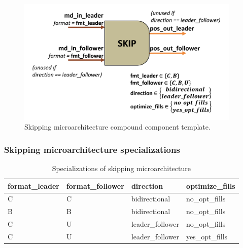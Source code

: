 \begin{figure}[H]
    \centering
    \includegraphics[width=0.95\textwidth]{figures/SKIP.png}
    \caption{Skipping microarchitecture compound component template.}
    \label{fig:SKIP}
\end{figure}

\subsubsection{Skipping microarchitecture specializations}

\begin{table}[ht]
\centering
\begin{tabular}{llll}
\toprule
 format\_leader   & format\_follower   & direction       & optimize\_fills   \\
\midrule
 C               & C                 & bidirectional   & no\_opt\_fills     \\
 B               & B                 & bidirectional   & no\_opt\_fills     \\
 C               & U                 & leader\_follower & no\_opt\_fills     \\
 C               & U                 & leader\_follower & yes\_opt\_fills    \\
\bottomrule
\end{tabular}
\caption{Specializations of skipping microarchitecture}
\label{tab:Skipping microarchitecture_specializations}
\end{table}

